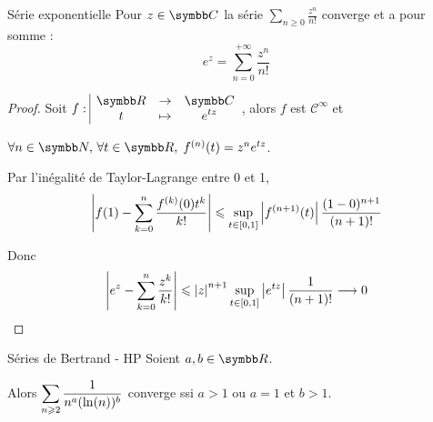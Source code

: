 \begin{proposition}{Série exponentielle}{}
    Pour $z \in \C$ la série $\sum_{n \geqslant 0} \frac{z^n}{n!}$ converge et a pour somme :
    \[e^z = \sum_{n = 0}^{+\infty} \frac{z^n}{n!}\]
\end{proposition}


\begin{proof}
    Soit $\fonction f \R \C t {e^{tz}}$, alors $f$ est $\mathscr C^\infty$ et 
    
    $\forall n \in \N, \, \forall t \in \R, \; f^{(n)}(t) = z^n e^{tz}$.

    Par l'inégalité de Taylor-Lagrange entre 0 et 1, 
    \[\left|f(1) - \sum_{k = 0}^{n} \frac{f^{(k)}(0)t^k}{k!}\right| \leqslant \sup_{t \in [0, 1]}\left|f^{(n + 1)}(t)\right| \frac{(1 - 0)^{n + 1}}{(n + 1)!}\]

    Donc 
    \[\left|e^z - \sum_{k = 0 }^{n}\frac{z^k}{k!}\right| \leqslant \left|z\right|^{n+1} \sup_{t \in [0, 1]} \left|e^{tz}\right| \frac{1}{(n + 1)!} \longrightarrow 0\]
\end{proof}

\begin{proposition}{Séries de Bertrand - HP}{}
    Soient $a, b \in \R$. 

    Alors $\displaystyle \sum_{n \geqslant 2} \frac 1 {n^a(\ln(n))^b}$ converge ssi $a > 1$ ou $a = 1$ et $b > 1$.
\end{proposition}


